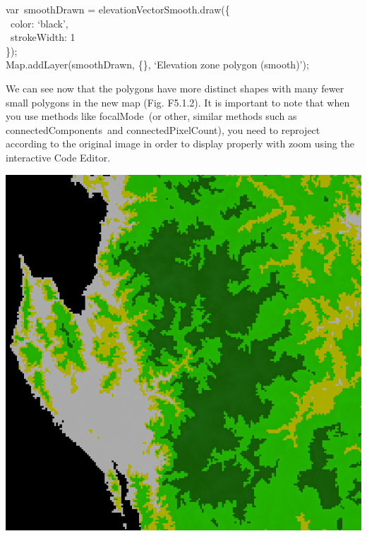 \documentclass[
  letterpaper,
  DIV=11,
  numbers=noendperiod]{scrreprt}
\begin{document}
var~smoothDrawn = elevationVectorSmooth.draw(\{\\
\hspace*{0.333em} ~color: `black',\\
\hspace*{0.333em} ~strokeWidth: 1\\
\});\\
Map.addLayer(smoothDrawn, \{\}, `Elevation zone polygon (smooth)');

We can see now that the polygons have more distinct shapes with many
fewer small polygons in the new map (Fig. F5.1.2). It is important to
note that when you use methods like focalMode~(or other, similar methods
such as connectedComponents~and connectedPixelCount), you need to
reproject according to the original image in order to display properly
with zoom using the interactive Code Editor.

\includegraphics{./F5/image20.png}
\end{document}
